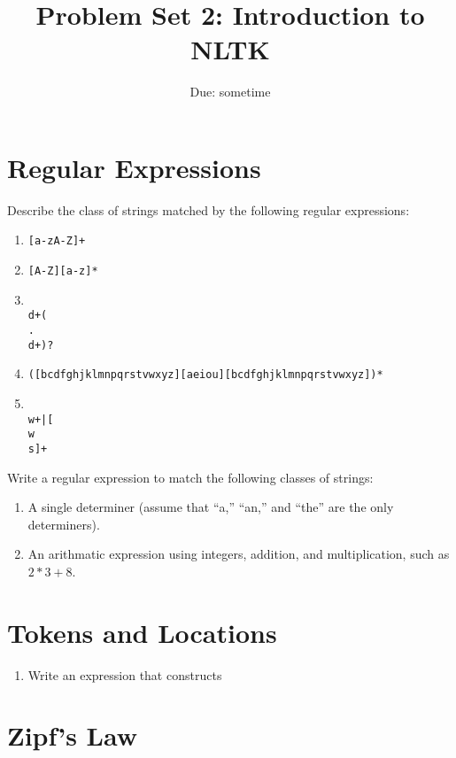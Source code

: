 \documentclass{article}
\begin{document}
\title{Problem Set 2: Introduction to NLTK}
\subtitle{Due: sometime}
\maketitle


\section{Regular Expressions}

Describe the class of strings matched by the following regular expressions:
\begin{enumerate}
    \item \texttt{[a-zA-Z]+}
    \item \texttt{[A-Z][a-z]*}
    \item \texttt{\\d+(\\.\\d+)?}
    \item \texttt{([bcdfghjklmnpqrstvwxyz][aeiou][bcdfghjklmnpqrstvwxyz])*}
    \item \texttt{\\w+|[\^\\w\\s]+}
\end{enumerate}

Write a regular expression to match the following classes of strings:

\begin{enumerate}
    \item A single determiner (assume that ``a,'' ``an,'' and ``the''
    are the only determiners).  
    \item An arithmatic expression using integers, addition, and
    multiplication, such as $2*3+8$.
\end{enumerate}

\section{Tokens and Locations}

\begin{enumerate}
    \item Write an expression that constructs 
\end{enumerate}

\section{Zipf's Law}
\end{document}
